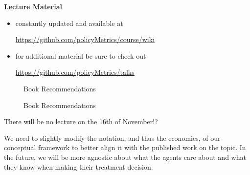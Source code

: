 \begin{frame}

\textbf{Lecture Material}
\begin{itemize}
\item constantly updated and available at\vspace{0.2cm}
\begin{center}\url{https://github.com/policyMetrics/course/wiki}\end{center}\vspace{0.3cm}
\item for additional material be sure to check out \vspace{0.2cm}
\begin{center}\url{https://github.com/policyMetrics/talks}\end{center}
\end{itemize}
\end{frame}

\begin{frame}
\begin{figure}
\caption{Book Recommendations}
\hspace{0.5cm}
\end{figure}
\end{frame}


\begin{frame}
\begin{figure}
\caption{Book Recommendations}
\hspace{0.5cm}
\end{figure}
\end{frame}


\begin{frame}\centering
There will be no lecture on the 16th of November!?
\end{frame}



\begin{frame}
We need to slightly modify the notation, and thus the economics, of our conceptual framework to better align it with the published work on the topic. In the future, we will be more agnostic about what the agents care about and what they know when making their treatment decision.
\end{frame}

